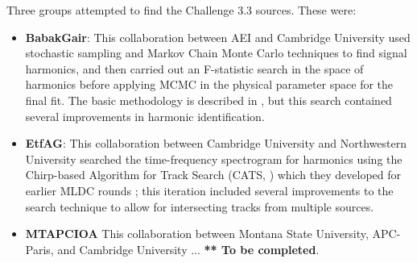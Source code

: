\documentclass{iopart}
\begin{document}
Three groups attempted to find the Challenge 3.3 sources.  These were:
\begin{itemize}
\item \textbf{BabakGair}: This collaboration between AEI and Cambridge University used stochastic sampling and Markov Chain Monte Carlo techniques to find signal harmonics, and then carried out an F-statistic search in the space of harmonics before applying MCMC in the physical parameter space for the final fit.  The basic methodology is described in \cite{BabakGairPorter}, but this search contained several improvements in harmonic identification.
\item \textbf{EtfAG}: This collaboration between Cambridge University and Northwestern University searched the time-frequency spectrogram for harmonics using the Chirp-based Algorithm for Track Search (CATS, \cite{CATS}) which they developed for earlier MLDC rounds \cite{GairMandelWen}; this iteration included several improvements to the search technique to allow for intersecting tracks from multiple sources.
\item \textbf{MTAPCIOA} This collaboration between Montana State University, APC-Paris, and Cambridge University ... {\bf *** To be completed}.
\end{itemize}
\end{document}
